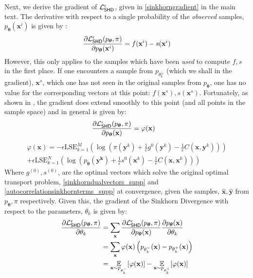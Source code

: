 Next, we derive the gradient of $\mathcal{L}^\epsilon_{\operatorname{\textsf{SHD}}}$, given in \eqref{sinkhorngradient} in the main text. The derivative with respect to a single probability of the \textit{observed} samples, $p_{\boldsymbol\theta}(\mathbf{x}^i)$ is given by :
\begin{align}
    \frac{\partial \mathcal{L}_{\operatorname{\textsf{SHD}}}^\epsilon(p_{\boldsymbol\theta}, \pi)}{\partial p_{\boldsymbol\theta}(\mathbf{x}^i)} = f(\mathbf{x}^i) - s(\mathbf{x}^i)
\end{align}
However, this only applies to the samples which have been \textit{used} to compute $f, s$ in the first place. If one encounters a sample from $p_{\theta_k^{\pm}}$ (which we shall in the gradient), $\mathbf{x}^s$, which one has not seen in the original samples from $p_{\boldsymbol\theta}$, one has no value for the corresponding vectors at this point: $f(\mathbf{x}^s), s(\mathbf{x}^s)$. Fortunately, as shown in , the gradient does extend smoothly to this point (and all points in the sample space) and in general is given by:
\begin{align}
    \frac{\partial \mathcal{L}_{\operatorname{\textsf{SHD}}}^\epsilon(p_{\boldsymbol\theta}, \pi)}{\partial p_{\boldsymbol\theta}(\mathbf{x})} &= \varphi(\mathbf{x}) 
\end{align}
\begin{multline}
    \varphi(\mathbf{x}) = -\epsilon \text{LSE}_{k=1}^M\left(\log\left(\pi(\mathbf{\mathbf{y}}^k) + \frac{1}{\epsilon}g^{0}(\mathbf{y}^k) - \frac{1}{\epsilon} C(\mathbf{x}, \mathbf{y}^k)\right)\right)\\
    + \epsilon \text{LSE}_{k=1}^N\left(\log\left(p_{\boldsymbol\theta}(\mathbf{\mathbf{y}^k}) + \frac{1}{\epsilon}s^{0}(\mathbf{x}^k) - \frac{1}{\epsilon} C(\mathbf{x}, \mathbf{x}^k)\right)\right)
\end{multline}
Where $g^{(0)}, s^{(0)}$, are the optimal vectors which solve the original optimal transport problem, \eqref{sinkhorndualvectors_supp} and \eqref{autocorrelationsinkhornterms_supp} at convergence, given the samples, $\hat{\mathbf{x}}, \hat{\mathbf{y}}$ from $p_{\boldsymbol\theta}, \pi$ respectively.
Given this, the gradient of the Sinkhorn Divergence with respect to the parameters, $\theta_k$ is given by:
\begin{align}
    \frac{\partial \mathcal{L}_{\operatorname{\textsf{SHD}}}^\epsilon(p_{\boldsymbol\theta}, \pi)}{\partial \theta_k} &= \sum\limits_{\mathbf{x}}\frac{\partial \mathcal{L}_{\operatorname{\textsf{SHD}}}^\epsilon(p_{\boldsymbol\theta}, \pi)}{\partial p_{\boldsymbol\theta}(\mathbf{x})}\frac{\partial p_{\boldsymbol\theta}(\mathbf{x})}{\partial \theta_k} \nonumber\\
    & = \sum\limits_\mathbf{x}\varphi(\mathbf{x})\left(p_{\theta^-_k}(\mathbf{x}) - p_{\theta^+_k}(\mathbf{x})\right) \nonumber \\
    & = \underset{\substack{\mathbf{x} \sim p_{\theta_k^-} }}{\mathbb{E}}[\varphi(\mathbf{x})] 
    -\underset{\substack{\mathbf{x} \sim p_{\theta_k^+}  }}{\mathbb{E}}[\varphi(\mathbf{x})] \label{sinkhorngradient_supp}
\end{align}

